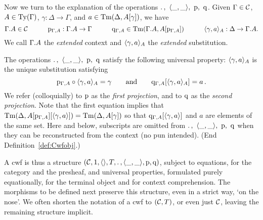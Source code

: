 \documentclass{lmcs}
\begin{document}
\begin{definition}
Now we turn to the explanation of the operations
${.\,},~\langle \_,\_ \rangle,~\mathrm{p},~\mathrm{q}$.
Given $\Gamma \in {\mathcal C}$, $A \in \mathrm{Ty}(\Gamma)$, $\gamma : \Delta \to \Gamma$,
and $a\in \mathrm{Tm}(\Delta, A[\gamma])$, we have
\[
\Gamma . A \in {\mathcal C}
\quad\qquad
\mathrm{p}_{\Gamma, A} : \Gamma . A \to \Gamma
\quad\qquad
\mathrm{q}_{\Gamma, A} \in \mathrm{Tm}(\Gamma. A, A[\mathrm{p}_{\Gamma,A}])
\quad\qquad
\langle \gamma, a \rangle_A : \Delta \to \Gamma . A.
\]
We call $\Gamma . A$ the \emph{extended} context
and $\langle \gamma, a \rangle_A$ the \emph{extended} substitution.

The operations  ${.\,},~\langle \_,\_ \rangle,~\mathrm{p},~\mathrm{q}$
satisfy the following universal property:
$\langle \gamma, a \rangle_A$ is the unique substitution satisfying
\[
\mathrm{p}_{\Gamma, A} \circ \langle \gamma, a \rangle_A = \gamma
\qquad \text{and}\qquad
\mathrm{q}_{\Gamma, A} [\langle \gamma, a \rangle_A] = a\,.
\]
We refer (colloquially) to $\mathrm{p}$ as the \emph{first projection},
and to $\mathrm{q}$ as the \emph{second projection}. %
{Note that the first equation implies that
$\mathrm{Tm}(\Delta,A[\mathrm{p}_{\Gamma,A}][\langle \gamma, a \rangle]) = \mathrm{Tm}(\Delta,A[\gamma])$
so that $\mathrm{q}_{\Gamma, A} [\langle \gamma, a \rangle]$ and $a$ are elements of the same set.}
Here and below, subscripts are omitted from ${.\,},~\langle \_,\_ \rangle,~\mathrm{p},~\mathrm{q}$
when they can be reconstructed from the context (no pun intended).
(End Definition~\ref{def:Cwfobj}.)
\end{definition}

A cwf is thus a structure $({\mathcal C},1,\langle  \rangle,T,.\, , \langle \_,\_ \rangle,\mathrm{p}, \mathrm{q})$,
subject to equations, for the category and the presheaf, and universal
properties, formulated purely equationally, for the terminal object and for context comprehension.
The morphisms to be defined next preserve this structure,
even in a strict way, `on the nose'.
We often shorten the notation of a cwf to $({\mathcal C},T)$, or even just ${\mathcal C}$,
leaving the remaining structure implicit.
\end{document}
